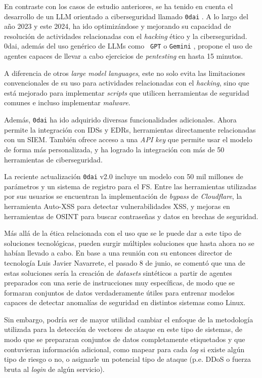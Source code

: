 En contraste con los casos de estudio anteriores, se ha tenido en cuenta el desarrollo de un \gls{LLM} orientado a ciberseguridad llamado \texttt{0dai} \cite{Navarrete2024}. A lo largo del año 2023 y este 2024, ha ido optimizándose y mejorando su capacidad de resolución de actividades relacionadas con el \textit{hacking} ético y la ciberseguridad. 0dai, además del uso genérico de \gls{LLM}s como \texttt{ \gls{GPT}} \cite{10500411} o \texttt{\gls{Gemini}} \cite{imran2024google}, propone el uso de agentes capaces de llevar a cabo ejercicios de \textit{pentesting} en hasta 15 minutos.

A diferencia de otros \textit{large model languages}, este no solo evita las limitaciones convencionales de su uso para actividades relacionadas con el \textit{hacking}, sino que está mejorado para implementar \textit{scripts} que utilicen herramientas de seguridad comunes e incluso implementar \textit{malware}. 

Además, \texttt{0dai} ha ido adquirido diversas funcionalidades adicionales. Ahora permite la integración con \gls{IDS}s y \gls{EDR}s, herramientas directamente relacionadas con un \gls{SIEM}. También ofrece acceso a una \textit{\gls{API} key} que permite usar el modelo de forma más personalizada, y ha logrado la integración con más de 50 herramientas de ciberseguridad. 

La reciente actualización \texttt{0dai} v2.0 incluye un modelo con 50 mil millones de parámetros y un sistema de registro para el \gls{FS}. Entre las herramientas utilizadas por sus usuarios se encuentran la implementación de \textit{bypass} de \textit{Cloudflare}, la herramienta Auto-\gls{XSS} para detectar vulnerabilidades \gls{XSS}, y mejoras en herramientas de \gls{OSINT} para buscar contraseñas y datos en brechas de seguridad.

Más allá de la ética relacionada con el uso que se le puede dar a este tipo de soluciones tecnológicas, pueden surgir múltiples soluciones que hasta ahora no se habían llevado a cabo. En base a una reunión con su entonces director de tecnología Luis Javier Navarrete, el pasado 8 de junio, se comentó que una de estas soluciones sería la creación de \textit{datasets} sintéticos a partir de agentes preparados con una serie de instrucciones muy específicas, de modo que se formaran conjuntos de datos verdaderamente útiles para entrenar modelos capaces de detectar anomalías de seguridad en distintos sistemas como Linux. 

Sin embargo, podría ser de mayor utilidad cambiar el enfoque de la metodología utilizada para la detección de vectores de ataque en este tipo de sistemas, de modo que se prepararan conjuntos de datos completamente etiquetados y que contuvieran información adicional, como mapear para cada \textit{log} si existe algún tipo de riesgo o no, o asignarle un potencial tipo de ataque (p.e. \gls{DDoS} o fuerza bruta al \textit{login} de algún servicio).

